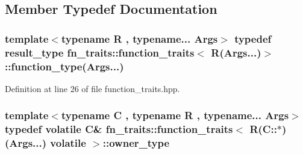 \subsection{Member Typedef Documentation}
\subsubsection[{\texorpdfstring{function\+\_\+type}{function_type}}]{\setlength{\rightskip}{0pt plus 5cm}template$<$typename R , typename... Args$>$ typedef {\bf result\+\_\+type} {\bf fn\+\_\+traits\+::function\+\_\+traits}$<$ R(Args...)$>$\+::function\+\_\+type(Args...)\hspace{0.3cm}{\ttfamily [inherited]}}\hypertarget{structfn__traits_1_1function__traits_3_01_r_07_args_8_8_8_08_4_a85e5883a1c8050fe442c1072386b2d11}{}\label{structfn__traits_1_1function__traits_3_01_r_07_args_8_8_8_08_4_a85e5883a1c8050fe442c1072386b2d11}


Definition at line 26 of file function\+\_\+traits.\+hpp.

\subsubsection[{\texorpdfstring{owner\+\_\+type}{owner_type}}]{\setlength{\rightskip}{0pt plus 5cm}template$<$typename C , typename R , typename... Args$>$ typedef volatile C\& {\bf fn\+\_\+traits\+::function\+\_\+traits}$<$ R(C\+::$\ast$)(Args...) volatile $>$\+::{\bf owner\+\_\+type}}\hypertarget{structfn__traits_1_1function__traits_3_01_r_07_c_1_1_5_08_07_args_8_8_8_08_01volatile_01_4_a6dd56bc0e49730063f88ae55fd055a84}{}\label{structfn__traits_1_1function__traits_3_01_r_07_c_1_1_5_08_07_args_8_8_8_08_01volatile_01_4_a6dd56bc0e49730063f88ae55fd055a84}


